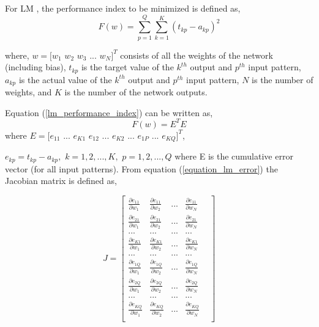 For LM , the performance index to be minimized is defined as,
\begin{equation}\label{lm_performance_index}
F(w)=\sum\limits_{p=1}^{Q}{\sum\limits_{k=1}^{K}(t_{kp}-a_{kp})^2}
\end{equation}

where, $w=[w_1 $ $ w_2 $ $ w_3 $ $ ...$ $  w_N]^T$ consists of all the weights of the network (including bias), $t_{kp}$ is the target value of the $k^{th}$ output and $p^{th}$ input pattern, $a_{kp}$ is the actual value of the $k^{th}$ output and $p^{th}$ input pattern, $N$ is the number of weights, and $K$ is the number of the network outputs.

Equation (\ref{lm_performance_index}) can be written as,
\begin{equation}\label{equation_lm_error}
F(w)=E^TE
\end{equation}
where
$ E=[e_{11}$ $...$ $ e_{K1} $ $ e_{12}$ $...$ $ e_{K2}$ $ ...$ $ e_{1P} $ $...$ $ e_{KQ}]^T$, 

$ e_{kp}=t_{kp}-a_{kp}, $ $ k=1,2,...,K, $ $ p=1,2,...,Q$
where E is the cumulative error vector (for all input patterns).
From equation (\ref{equation_lm_error}) the Jacobian matrix is defined as,

\begin{equation}\label{jacobian_matrix}
 J=
\begin{bmatrix}
\frac{\partial{e_{11}}}{\partial{w_{1}}} & \frac{\partial{e_{11}}}{\partial{w_{2}}} & ... & \frac{\partial{e_{11}}}{\partial{w_{N}}} \\

\frac{\partial{e_{21}}}{\partial{w_{1}}} & \frac{\partial{e_{21}}}{\partial{w_{2}}} & ... & \frac{\partial{e_{21}}}{\partial{w_{N}}} \\

...&...&...&...&\\

\frac{\partial{e_{K1}}}{\partial{w_{1}}} & \frac{\partial{e_{K1}}}{\partial{w_{2}}} & ... & \frac{\partial{e_{K1}}}{\partial{w_{N}}} \\

...&...&...&...&\\

\frac{\partial{e_{1Q}}}{\partial{w_{1}}} & \frac{\partial{e_{1Q}}}{\partial{w_{2}}} & ... & \frac{\partial{e_{1Q}}}{\partial{w_{N}}} \\

\frac{\partial{e_{2Q}}}{\partial{w_{1}}} & \frac{\partial{e_{2Q}}}{\partial{w_{2}}} & ... & \frac{\partial{e_{2Q}}}{\partial{w_{N}}} \\
...&...&...&...&\\

\frac{\partial{e_{KQ}}}{\partial{w_{1}}} & \frac{\partial{e_{KQ}}}{\partial{w_{2}}} & ... & \frac{\partial{e_{KQ}}}{\partial{w_{N}}} \\
\end{bmatrix}
\end{equation}

